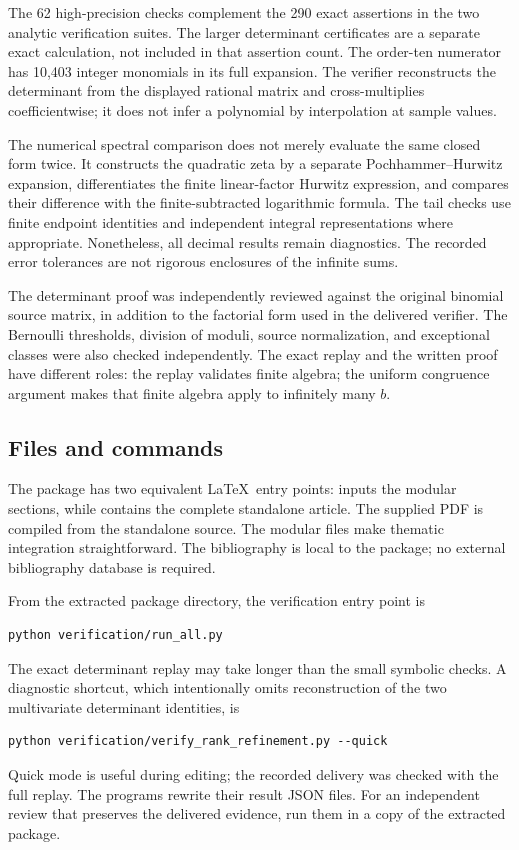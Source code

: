 \documentclass[11pt,a4paper]{article}
\numberwithin{equation}{section}
\theoremstyle{definition}
\theoremstyle{remark}
\begin{document}
The 62 high-precision checks complement the 290 exact assertions in
the two analytic verification suites. The larger determinant
certificates are a separate exact calculation, not included in that
assertion count. The order-ten numerator has 10,403 integer monomials
in its full expansion. The verifier reconstructs the determinant from
the displayed rational matrix and cross-multiplies coefficientwise;
it does not infer a polynomial by interpolation at sample values.

The numerical spectral comparison does not merely evaluate the same
closed form twice. It constructs the quadratic zeta by a separate
Pochhammer--Hurwitz expansion, differentiates the finite linear-factor
Hurwitz expression, and compares their difference with the
finite-subtracted logarithmic formula. The tail checks use finite
endpoint identities and independent integral representations where
appropriate. Nonetheless, all decimal results remain diagnostics.
The recorded error tolerances are not rigorous enclosures of the
infinite sums.

The determinant proof was independently reviewed against the original
binomial source matrix, in addition to the factorial form used in the
delivered verifier. The Bernoulli thresholds, division of moduli,
source normalization, and exceptional classes were also checked
independently. The exact replay and the written proof have different
roles: the replay validates finite algebra; the uniform congruence
argument makes that finite algebra apply to infinitely many $b$.

\subsection{Files and commands}

The package has two equivalent \LaTeX\ entry points:
 inputs the modular sections, while
 contains the complete
standalone article. The supplied PDF is compiled from the standalone
source. The modular files make thematic integration straightforward.
The bibliography is local to the package; no external bibliography
database is required.

From the extracted package directory, the verification entry point is
\begin{verbatim}
python verification/run_all.py
\end{verbatim}
The exact determinant replay may take longer than the small symbolic
checks. A diagnostic shortcut, which intentionally omits reconstruction
of the two multivariate determinant identities, is
\begin{verbatim}
python verification/verify_rank_refinement.py --quick
\end{verbatim}
Quick mode is useful during editing; the recorded delivery was checked
with the full replay. The programs rewrite their result JSON files.
For an independent review that preserves the delivered evidence,
run them in a copy of the extracted package.
\end{document}
